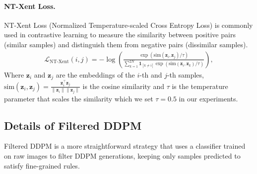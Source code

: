 \paragraph{NT-Xent Loss.} NT-Xent Loss (Normalized Temperature-scaled Cross Entropy Loss) \cite{sohn2016improved} is commonly used in contrastive learning to measure the similarity between positive pairs (similar samples) and distinguish them from negative pairs (dissimilar samples). 
\begin{align}
    \mathcal{L}_{\text{NT-Xent}}(i, j) = -\log \left( \frac{\exp(\text{sim}(\mathbf{z}_i, \mathbf{z}_j)/\tau)}{\sum_{k=1}^{2N} \mathbf{1}_{[k \neq i]} \exp(\text{sim}(\mathbf{z}_i, \mathbf{z}_k)/\tau)} \right),
\end{align}
Where \( \mathbf{z}_i \) and \( \mathbf{z}_j \) are the embeddings of the \(i\)-th and \(j\)-th samples, \( \text{sim}(\mathbf{z}_i, \mathbf{z}_j) = \frac{\mathbf{z}_i^\top \mathbf{z}_j}{\|\mathbf{z}_i\| \|\mathbf{z}_j\|} \) is the cosine similarity and \( \tau \) is the temperature parameter that scales the similarity which  we set $\tau = 0.5$ in our experiments.
\subsection{Details of Filtered DDPM}
Filtered DDPM is a more straightforward strategy that uses a classifier trained on raw images to filter DDPM generations, keeping only samples predicted to satisfy fine-grained rules.
